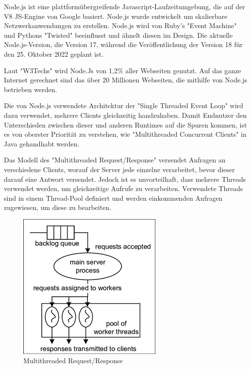 \label{sec:nodejs}
Node.js ist eine plattformübergreifende Javascript-Laufzeitumgebung, die auf der V8 JS-Engine von Google basiert. Node.js wurde entwickelt um skalierbare Netzwerkanwendungen zu erstellen. Node.js wird von Ruby's "Event Machine" und Pythons "Twisted" beeinflusst und ähnelt diesen im Design. Die aktuelle Node.js-Version, die Version 17, während die Veröffentlichung der Version 18 für den 25. Oktober 2022 geplant ist. \cite{NodeInfo}

Laut "W3Techs" wird Node.Js von 1,2\% aller Webseiten genutzt. Auf das ganze Internet gerechnet sind das über 20 Millionen Webseiten, die mithilfe von Node.js betrieben werden. \cite{NodeInfo} \cite{Node}

Die von Node.js verwendete Architektur der "Single Threaded Event Loop" wird dazu verwendet, mehrere Clients gleichzeitig handzuhaben. Damit Endnutzer den  Unterschieden zwischen dieser und anderen Runtimes auf die Spuren kommen, ist es von oberster Priorität zu verstehen, wie "Multithreaded Concurrent Clients" in Java gehandhabt werden. \cite{NodeJs.dev}


Das Modell des "Multithreaded Request/Response" versendet Anfragen an verschiedene Clients, worauf der Server jede einzelne verarbeitet, bevor dieser darauf eine Antwort versendet. Jedoch ist es unvorteilhaft, dass mehrere Threads verwendet werden, um gleichzeitige Aufrufe zu verarbeiten. Verwendete Threads sind in einem Thread-Pool definiert und werden einkommenden Anfragen zugewiesen, um diese zu bearbeiten. \cite{Arocom}



\begin{figure}[H]
    \centering
    \includegraphics{media/NodeJs/MultiThreadedRequestResponse.png}
    \caption{Multithreaded Request/Response \cite{Multithreaded}}
\end{figure}

